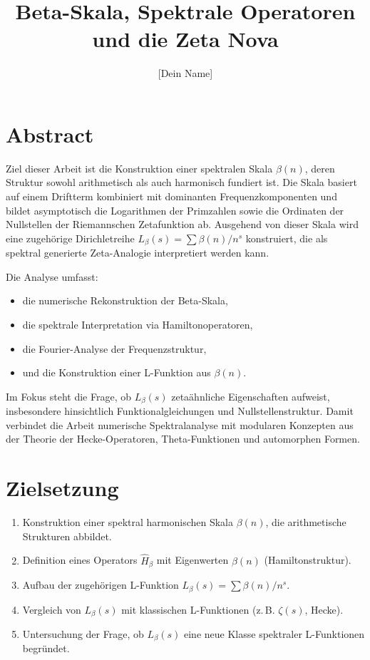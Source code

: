 \documentclass[12pt]{article}
\title{Beta-Skala, Spektrale Operatoren und die Zeta Nova}
\author{[Dein Name]}
\date{}
\begin{document}
\maketitle

\section*{Abstract}

Ziel dieser Arbeit ist die Konstruktion einer spektralen Skala $\beta(n)$, deren Struktur sowohl arithmetisch als auch harmonisch fundiert ist. Die Skala basiert auf einem Driftterm kombiniert mit dominanten Frequenzkomponenten und bildet asymptotisch die Logarithmen der Primzahlen sowie die Ordinaten der Nullstellen der Riemannschen Zetafunktion ab. Ausgehend von dieser Skala wird eine zugehörige Dirichletreihe $L_\beta(s) = \sum \beta(n)/n^s$ konstruiert, die als spektral generierte Zeta-Analogie interpretiert werden kann.

Die Analyse umfasst:
\begin{itemize}
  \item die numerische Rekonstruktion der Beta-Skala,
  \item die spektrale Interpretation via Hamiltonoperatoren,
  \item die Fourier-Analyse der Frequenzstruktur,
  \item und die Konstruktion einer L-Funktion aus $\beta(n)$.
\end{itemize}

Im Fokus steht die Frage, ob $L_\beta(s)$ zetaähnliche Eigenschaften aufweist, insbesondere hinsichtlich Funktionalgleichungen und Nullstellenstruktur. Damit verbindet die Arbeit numerische Spektralanalyse mit modularen Konzepten aus der Theorie der Hecke-Operatoren, Theta-Funktionen und automorphen Formen.

\section*{Zielsetzung}

\begin{enumerate}
  \item Konstruktion einer spektral harmonischen Skala $\beta(n)$, die arithmetische Strukturen abbildet.
  \item Definition eines Operators $\hat{H}_\beta$ mit Eigenwerten $\beta(n)$ (Hamiltonstruktur).
  \item Aufbau der zugehörigen L-Funktion $L_\beta(s) = \sum \beta(n)/n^s$.
  \item Vergleich von $L_\beta(s)$ mit klassischen L-Funktionen (z.\,B. $\zeta(s)$, Hecke).
  \item Untersuchung der Frage, ob $L_\beta(s)$ eine neue Klasse spektraler L-Funktionen begründet.
\end{enumerate}
\end{document}
